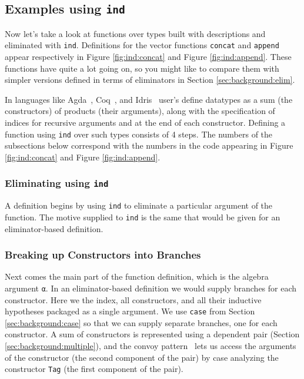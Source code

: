 \documentclass[preprint,nonatbib]{sigplanconf}
\begin{document}
\subsection{Examples using {\tt ind}}

Now let's take a look at functions over types built with descriptions
and eliminated with {\tt ind}. Definitions for the vector functions
{\tt concat} and {\tt append} appear respectively in
Figure \ref{fig:ind:concat} and Figure \ref{fig:ind:append}. These
functions have quite a lot going on, so you might like to compare them with
simpler versions defined in terms of eliminators in
Section \ref{sec:background:elim}.

In languages like
{\sc Agda}~\citep{norell2007towards},
{\sc Coq}~\citep{coq08}, and
{\sc Idris}~\citep{brady2011idris} user's define
datatypes as a sum (the constructors) of products (their arguments),
along with the specification of indices for recursive arguments and at
the end of each constructor. Defining a function using {\tt ind} over
such types consists of 4 steps. The numbers of the subsections below
correspond with the numbers in
the code appearing in Figure \ref{fig:ind:concat} and
Figure \ref{fig:ind:append}.

\subsubsection{Eliminating using {\tt ind}}
A definition begins by using {\tt ind} to eliminate a particular
argument of the function. The motive supplied to {\tt ind} is the same
that would be given for an eliminator-based definition.

\subsubsection{Breaking up Constructors into Branches}
Next comes the main part of the function definition, which is the
algebra argument {\tt α}. In an eliminator-based definition we would
supply branches for each constructor. Here we the index, all
constructors, and all their inductive hypotheses packaged as a single
argument. We use {\tt case} from Section
\ref{sec:background:case} so that we can supply separate branches, one
for each constructor. A sum of constructors is represented
using a dependent pair (Section
\ref{sec:background:multiple}), and the convoy
pattern~\citep{TODO} lets us access the arguments of the constructor
(the second component of the pair) by case analyzing the
constructor {\tt Tag} (the first component of the pair).
\end{document}
